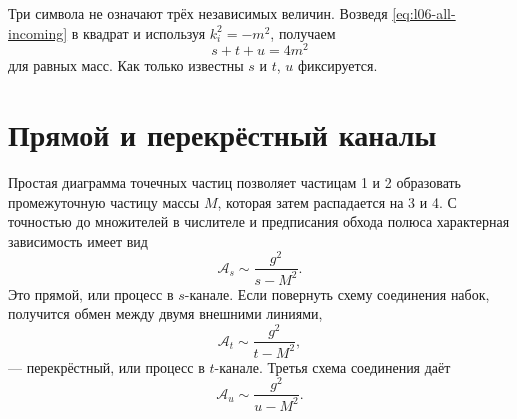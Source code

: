 Три символа не означают трёх независимых величин. Возведя \eqref{eq:l06-all-incoming} в квадрат и используя \(k_i^2=-m^2\), получаем
\begin{equation}
  s+t+u=4m^2
  \label{eq:l06-stu-constraint}
\end{equation}
для равных масс. Как только известны \(s\) и \(t\), \(u\) фиксируется.

\begin{classroomqa}
\end{classroomqa}

\begin{classroomqa}
\end{classroomqa}

\section{Прямой и перекрёстный каналы}

Простая диаграмма точечных частиц позволяет частицам 1 и 2 образовать промежуточную частицу массы \(M\), которая затем распадается на 3 и 4. С точностью до множителей в числителе и предписания обхода полюса характерная зависимость имеет вид
\begin{equation}
  \mathcal A_s\sim\frac{g^2}{s-M^2}.
  \label{eq:l06-s-channel}
\end{equation}
Это прямой, или процесс в \(s\)-канале. Если повернуть схему соединения набок, получится обмен между двумя внешними линиями,
\begin{equation}
  \mathcal A_t\sim\frac{g^2}{t-M^2},
  \label{eq:l06-t-channel}
\end{equation}
— перекрёстный, или процесс в \(t\)-канале. Третья схема соединения даёт
\begin{equation}
  \mathcal A_u\sim\frac{g^2}{u-M^2}.
  \label{eq:l06-u-channel}
\end{equation}

